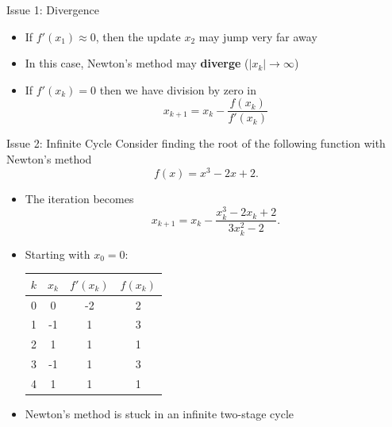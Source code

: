\documentclass[10pt]{beamer}
\begin{document}
\begin{frame}{Issue 1: Divergence}

\begin{center}
\end{center}

\begin{itemize}
    \item If \( f'(x_1) \approx 0 \), then the update \( x_2 \) may jump very far away
    \item In this case, Newton's method may \textbf{diverge} ($|x_k| \rightarrow \infty$)
    \item If \( f'(x_k) =0 \) then we have division by zero in 
    $$x_{k+1} = x_k - \frac{f(x_k)}{f'(x_k)}$$
\end{itemize}
\end{frame}
\begin{frame}{Issue 2: Infinite Cycle}
    Consider finding the root of the following function with Newton's method
        \[
        f(x) = x^3 - 2x + 2.
        \]
\begin{itemize}
    \item The iteration becomes
        \[
        x_{k+1} = x_k - \frac{x_k^3 - 2x_k + 2}{3x_k^2 - 2}.
        \]
    \item Starting with \( x_0 = 0 \):
\begin{center}
  \small
  \renewcommand{\arraystretch}{1.3}
  \begin{tabular}{cccc}
    \(k\) & \(x_k\) & \(f'(x_k)\) & \(f(x_k)\) \\ \hline
     0   &  0      & -2         & 2         \\
     1   & -1      & 1          & 3         \\
     2   &  1      & 1          & 1         \\
     3   & -1      & 1          & 3         \\
     4   &  1      & 1          & 1         
  \end{tabular}
\end{center}
    \item Newton's method is stuck in an infinite two-stage cycle
\end{itemize}
\end{frame}
\end{document}
